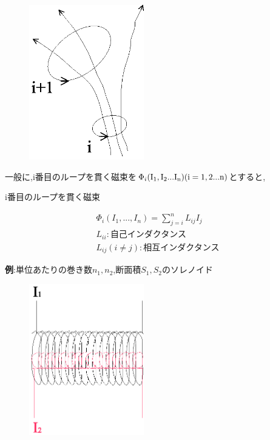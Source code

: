 \documentclass{jsarticle}
\begin{document}
\begin{figure}[htbp]
 \begin{center}
  \includegraphics[width=50mm]{11.3.eps}
 \end{center}
 \caption{}
 \label{fig:one}
\end{figure}

一般に,i番目のループを貫く磁束を$\Phi_i {\rm (I_1,I_2...I_n) (i=1,2...n)}$とすると,

\begin{itembox}[c]{i番目のループを貫く磁束}

\begin{eqnarray*}
\Phi_i(I_1,...,I_n) = \sum_{j=i}^{n}L_{ij}I_j \\
L_{ii}:\mbox{自己インダクタンス} \\
L_{ij}(i \neq j) : \mbox{相互インダクタンス}
\end{eqnarray*}

\end{itembox}



\newpage

{\bf 例}:単位あたりの巻き数$n_1,n_2$,断面積$S_1,S_2$のソレノイド \\


\begin{figure}[htbp]
 \begin{center}
  \includegraphics[width=50mm]{11.4.eps}
 \end{center}
 \caption{}
 \label{fig:one}
\end{figure}
\end{document}

